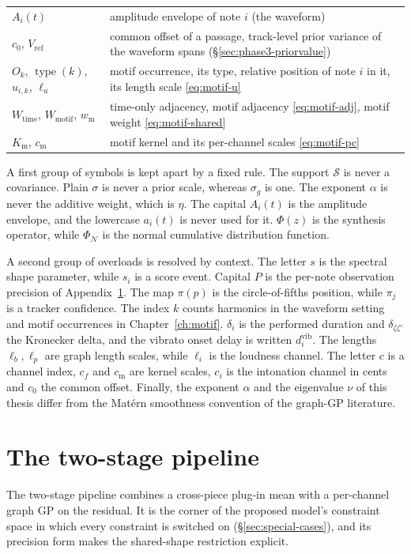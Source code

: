 \documentclass[11pt,a4paper]{report}
\newcommand{\N}{\mathcal{N}}
\newcommand{\score}{\mathcal{S}}
\begin{document}
\begin{center}
\begin{longtable}{@{}p{4.3cm}p{9.2cm}@{}}
$A_i(t)$ & amplitude envelope of note $i$ (the waveform) \\
$c_0$, $V_{\mathrm{ref}}$ & common offset of a passage, track-level prior variance of the waveform spans (\S\ref{sec:phase3-priorvalue}) \\
$O_k$, $\operatorname{type}(k)$, $u_{i,k}$, $\ell_u$ & motif occurrence, its type, relative position of note $i$ in it, its length scale \eqref{eq:motif-u} \\
$W_{\mathrm{time}}$, $W_{\mathrm{motif}}$, $w_{\mathrm m}$ & time-only adjacency, motif adjacency \eqref{eq:motif-adj}, motif weight \eqref{eq:motif-shared} \\
$K_{\mathrm m}$, $c_{\mathrm m}$ & motif kernel and its per-channel scales \eqref{eq:motif-pc} \\
\end{longtable}
\end{center}
\noindent A first group of symbols is kept apart by a fixed rule. The
support $\score$ is never a covariance. Plain $\sigma$ is never a prior
scale, whereas $\sigma_g$ is one. The exponent $\alpha$ is never the
additive weight, which is $\eta$. The capital $A_i(t)$ is the amplitude
envelope, and the lowercase $a_i(t)$ is never used for it. $\Phi(z)$ is the
synthesis operator, while $\Phi_{\N}$ is the normal cumulative distribution
function.

A second group of overloads is resolved by context. The letter $s$ is the
spectral shape parameter, while $s_i$ is a score event. Capital $P$ is the
per-note observation precision of Appendix~\ref{app:lineage}. The map $\pi(p)$ is the circle-of-fifths
position, while $\pi_j$ is a tracker confidence. The index $k$ counts
harmonics in the waveform setting and motif occurrences in
Chapter~\ref{ch:motif}. $\delta_i$ is the performed duration and
$\delta_{\zeta\zeta'}$ the Kronecker delta, and the vibrato onset delay is
written $d_i^{\mathrm{vib}}$. The lengths $\ell_b, \ell_p$ are graph length
scales, while $\ell_i$ is the loudness channel. The letter $c$ is a channel
index, $c_f$ and $c_{\mathrm m}$ are kernel scales, $c_i$ is the intonation
channel in cents and $c_0$ the common offset. Finally, the exponent
$\alpha$ and the eigenvalue $\nu$ of this thesis differ from the Mat\'ern
smoothness convention of the graph-GP literature.


\chapter{The two-stage pipeline}\label{app:lineage}
The two-stage pipeline combines a cross-piece plug-in mean with a
per-channel graph GP on the residual. It is the corner of the proposed
model's constraint space in which every constraint is switched on
(\S\ref{sec:special-cases}), and its precision form makes the shared-shape
restriction explicit.
\end{document}
